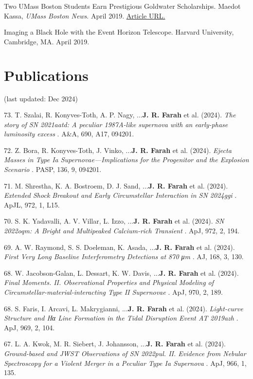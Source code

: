 \documentclass[margin,line]{res}
\begin{document}
\begin{resume}
Two UMass Boston Students Earn Prestigious Goldwater Scholarships. Maedot Kassa, \textit{UMass Boston News}. April 2019. {\color{blue}\href{https://www.umb.edu/news/detail/two_umass_boston_students_earn_prestigious_goldwater_scholarships}{Article URL.}}


Imaging a Black Hole with the Event Horizon Telescope. Harvard University, Cambridge, MA. April
2019.




\vspace{+.4cm}
\section{\sc Publications} 
\label{sec:publications}

(last updated: Dec 2024)

73. T. Szalai, R. Konyves-Toth, A. P. Nagy, ...\textbf{J. R. Farah} et al. (2024). \textit{ The story of SN 2021aatd: A peculiar 1987A-like supernova with an early-phase luminosity excess }. A\&A, 690, A17, 094201.

72. Z. Bora, R. Konyves-Toth, J. Vinko, ...\textbf{J. R. Farah} et al. (2024). \textit{ Ejecta Masses in Type Ia Supernovae—Implications for the Progenitor and the Explosion Scenario }. PASP, 136, 9, 094201.

71. M. Shrestha, K. A. Bostroem, D. J. Sand, ...\textbf{J. R. Farah} et al. (2024). \textit{ Extended Shock Breakout and Early Circumstellar Interaction in SN 2024ggi }. ApJL, 972, 1, L15.

70. S. K. Yadavalli, A. V. Villar, L. Izzo, ...\textbf{J. R. Farah} et al. (2024). \textit{ SN 2022oqm: A Bright and Multipeaked Calcium-rich Transient }. ApJ, 972, 2, 194.

69. A. W. Raymond, S. S. Doeleman, K. Asada, ...\textbf{J. R. Farah} et al. (2024). \textit{ First Very Long Baseline Interferometry Detections at 870 μm }. AJ, 168, 3, 130.

68. W. Jacobson-Galan, L. Dessart, K. W. Davis, ...\textbf{J. R. Farah} et al. (2024). \textit{  Final Moments. II. Observational Properties and Physical Modeling of Circumstellar-material-interacting Type II Supernovae }. ApJ, 970, 2, 189.

68. S. Faris, I. Arcavi, L. Makrygianni, ...\textbf{J. R. Farah} et al. (2024). \textit{  Light-curve Structure and Hα Line Formation in the Tidal Disruption Event AT 2019azh }. ApJ, 969, 2, 104.

67. L. A. Kwok, M. R. Siebert, J. Johansson, ...\textbf{J. R. Farah} et al. (2024). \textit{ Ground-based and JWST Observations of SN 2022pul. II. Evidence from Nebular Spectroscopy for a Violent Merger in a Peculiar Type Ia Supernova }. ApJ, 966, 1, 135.


\end{resume}
\end{document}
